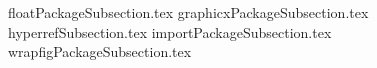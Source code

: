 \documentclass[class=article , crop=false, titlepage, twoside, multi={itemize, figure, verbatim}, float=false]{standalone}
\title{}  %
\begin{document}
\ifstandalone
\maketitle %
\clearpage
\tableofcontents %
\clearpage
\fi


{floatPackageSubsection.tex}
{graphicxPackageSubsection.tex}
{hyperrefSubsection.tex}
{importPackageSubsection.tex}
{wrapfigPackageSubsection.tex}
\end{document}
